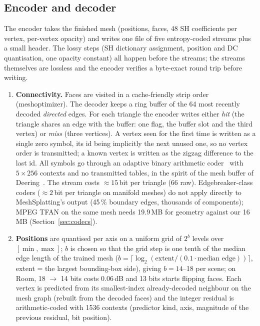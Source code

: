 \documentclass[11pt,a4paper]{article}
\begin{document}
\subsection{Encoder and decoder}
\label{sec:codec}

The encoder takes the finished mesh (positions, faces, 48 SH coefficients per vertex, per-vertex opacity) and writes one file of five entropy-coded streams plus a small header. The lossy steps (SH dictionary assignment, position and DC quantisation, one opacity constant) all happen before the streams; the streams themselves are lossless and the encoder verifies a byte-exact round trip before writing.
\begin{enumerate}[nosep,leftmargin=*]
  \item \textbf{Connectivity.} Faces are visited in a cache-friendly strip order (meshoptimizer). The decoder keeps a ring buffer of the 64 most recently decoded \emph{directed} edges. For each triangle the encoder writes either \emph{hit} (the triangle shares an edge with the buffer: one flag, the buffer slot and the third vertex) or \emph{miss} (three vertices). A vertex seen for the first time is written as a single zero symbol, its id being implicitly the next unused one, so no vertex order is transmitted; a known vertex is written as the zigzag difference to the last id. All symbols go through an adaptive binary arithmetic coder~\cite{witten1987} with $5\times 256$ contexts and no transmitted tables, in the spirit of the mesh buffer of Deering~\cite{deering1995}. The stream costs $\approx 15$\,bit per triangle (66 raw). Edgebreaker-class coders ($\approx 2$\,bit per triangle on manifold meshes) do not apply directly to MeshSplatting's output (45\,\% boundary edges, thousands of components); MPEG TFAN on the same mesh needs 19.9\,MB for geometry against our 16\,MB (Section~\ref{sec:codecs}).
  \item \textbf{Positions} are quantised per axis on a uniform grid of $2^b$ levels over $[\min, \max]$; $b$ is chosen so that the grid step is one tenth of the median edge length of the trained mesh ($b = \lceil \log_2(\text{extent} / (0.1\cdot\text{median edge})) \rceil$, extent = the largest bounding-box side), giving $b = 14$--18 per scene; on Room, 18 $\to$ 14 bits costs 0.06\,dB and 13 bits starts flipping faces. Each vertex is predicted from its smallest-index already-decoded neighbour on the mesh graph (rebuilt from the decoded faces) and the integer residual is arithmetic-coded with 1536 contexts (predictor kind, axis, magnitude of the previous residual, bit position).

\end{enumerate}
\end{document}
